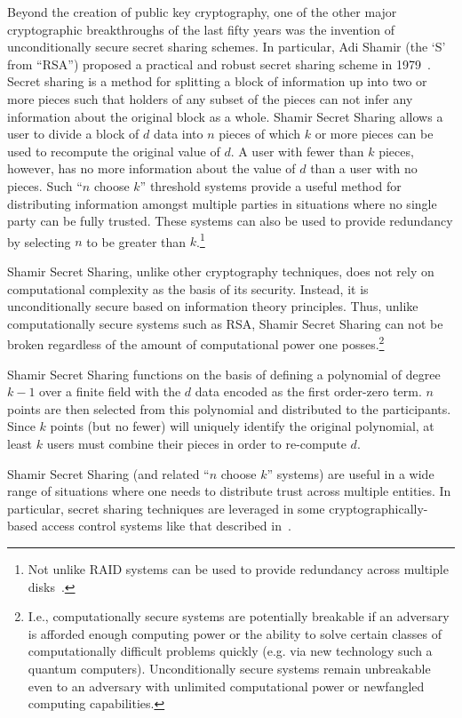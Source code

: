 Beyond the creation of public key cryptography, one of the other major
cryptographic breakthroughs of the last fifty years was the invention
of unconditionally secure secret sharing schemes. In particular, Adi
Shamir (the `S' from ``RSA'') proposed a practical and robust secret
sharing scheme in 1979~\cite{shamir1979}. Secret sharing is a method
for splitting a block of information up into two or more pieces such
that holders of any subset of the pieces can not infer any information
about the original block as a whole. Shamir Secret Sharing allows a
user to divide a block of $d$ data into $n$ pieces of which $k$ or
more pieces can be used to recompute the original value of $d$. A user
with fewer than $k$ pieces, however, has no more information about the
value of $d$ than a user with no pieces. Such ``$n$ choose $k$''
threshold systems provide a useful method for distributing information
amongst multiple parties in situations where no single party can be
fully trusted. These systems can also be used to provide redundancy by
selecting $n$ to be greater than $k$.\footnote{Not unlike RAID systems
  can be used to provide redundancy across multiple
  disks~\cite{patterson1988}.}

Shamir Secret Sharing, unlike other cryptography techniques, does not
rely on computational complexity as the basis of its
security. Instead, it is unconditionally secure based on information
theory principles. Thus, unlike computationally secure systems such as
RSA, Shamir Secret Sharing can not be broken regardless of the amount
of computational power one posses.\footnote{ I.e., computationally
  secure systems are potentially breakable if an adversary is afforded
  enough computing power or the ability to solve certain classes of
  computationally difficult problems quickly (e.g. via new technology
  such a quantum computers). Unconditionally secure systems remain
  unbreakable even to an adversary with unlimited computational power
  or newfangled computing capabilities.}

Shamir Secret Sharing functions on the basis of defining a polynomial
of degree $k-1$ over a finite field with the $d$ data encoded as the
first order-zero term. $n$ points are then selected from this
polynomial and distributed to the participants. Since $k$ points (but
no fewer) will uniquely identify the original polynomial, at least $k$
users must combine their pieces in order to re-compute $d$.

Shamir Secret Sharing (and related ``$n$ choose $k$'' systems) are
useful in a wide range of situations where one needs to distribute
trust across multiple entities. In particular, secret sharing
techniques are leveraged in some cryptographically-based access
control systems like that described in~\cite{goyal2006}.

